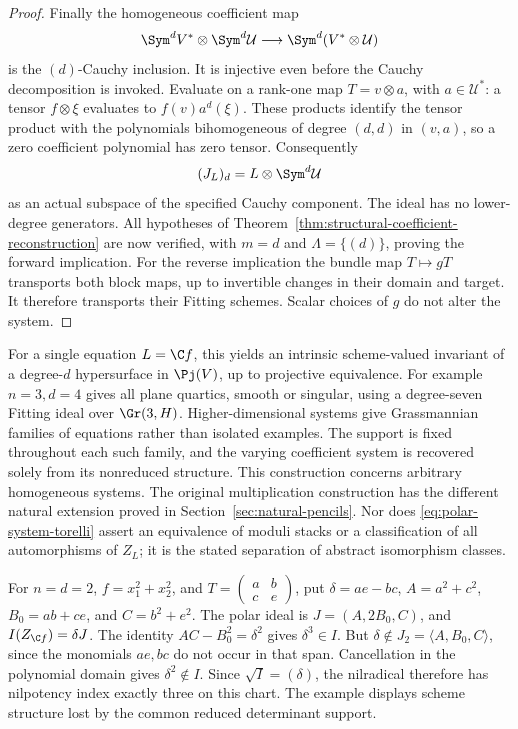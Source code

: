 \begin{proof}
Finally the homogeneous coefficient map
\begin{equation}\label{eq:polar-cauchy-inclusion}
 \Sym^d V^*\otimes\Sym^d\mathcal U
       \longrightarrow\Sym^d(V^*\otimes\mathcal U)
\end{equation}
is the \((d)\)-Cauchy inclusion.  It is injective even before the
Cauchy decomposition is invoked.  Evaluate on a rank-one map
\(T=v\otimes a\), with \(a\in\mathcal U^*\): a tensor
\(f\otimes\xi\) evaluates to \(f(v)a^d(\xi)\).  These products
identify the tensor product with the polynomials bihomogeneous of
degree \((d,d)\) in \((v,a)\), so a zero coefficient polynomial
has zero tensor.  Consequently
\begin{equation}\label{eq:polar-left-module}
                  (J_L)_d=L\otimes\Sym^d\mathcal U
\end{equation}
as an actual subspace of the specified Cauchy component.  The ideal
has no lower-degree generators.  All hypotheses of
Theorem~\ref{thm:structural-coefficient-reconstruction} are now
verified, with \(m=d\) and \(\Lambda=\{(d)\}\), proving the
forward implication.  For the reverse implication the bundle map
\(T\mapsto gT\) transports both block maps, up to invertible
changes in their domain and target.  It therefore transports their
Fitting schemes.  Scalar choices of \(g\) do not alter the system.
\end{proof}

For a single equation \(L=\C f\), this yields an intrinsic
scheme-valued invariant of a degree-\(d\) hypersurface in
\(\Pj(V)\), up to projective equivalence.  For example \(n=3,d=4\)
gives all plane quartics, smooth or singular, using a degree-seven
Fitting ideal over \(\Gr(3,H)\).  Higher-dimensional systems give
Grassmannian families of equations rather than isolated examples.
The support is fixed throughout each such family, and the varying
coefficient system is recovered solely from its nonreduced structure.
This construction concerns arbitrary homogeneous systems.  The
original multiplication construction has the different natural
extension proved in Section~\ref{sec:natural-pencils}.
Nor does \eqref{eq:polar-system-torelli} assert an equivalence of
moduli stacks or a classification of all automorphisms of \(Z_L\);
it is the stated separation of abstract isomorphism classes.

\begin{example}
\label{ex:polar-nilpotence-three}
For \(n=d=2\), \(f=x_1^2+x_2^2\), and
\(T=\left(\begin{smallmatrix}a&b\\c&e\end{smallmatrix}\right)\),
put \(\delta=ae-bc\), \(A=a^2+c^2\), \(B_0=ab+ce\),
and \(C=b^2+e^2\).  The polar ideal is
\(J=(A,2B_0,C)\), and \(I(Z_{\C f})=\delta J\).
The identity \(AC-B_0^2=\delta^2\) gives \(\delta^3\in I\).
But \(\delta\notin J_2=\langle A,B_0,C\rangle\), since the
monomials \(ae,bc\) do not occur in that span.  Cancellation in
the polynomial domain gives \(\delta^2\notin I\).
Since \(\sqrt I=(\delta)\), the nilradical therefore has
nilpotency index exactly three on this chart.  The example displays
scheme structure lost by the common reduced determinant support.
\end{example}
